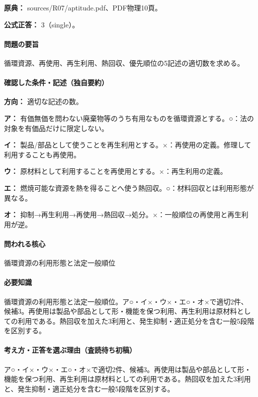 \noindent\textbf{原典：} sources/R07/aptitude.pdf、PDF物理10頁。

\textbf{公式正答：} 3（single）。

\paragraph{問題の要旨} 循環資源、再使用、再生利用、熱回収、優先順位の5記述の適切数を求める。

\paragraph{確認した条件・記述（独自要約）}\mbox{}\par

\noindent\textbf{方向：} 適切な記述の数。\par

\noindent\textbf{ア：} 有価無価を問わない廃棄物等のうち有用なものを循環資源とする。○：法の対象を有価品だけに限定しない。\par

\noindent\textbf{イ：} 製品/部品として使うことを再生利用とする。×：再使用の定義。修理して利用することも再使用。\par

\noindent\textbf{ウ：} 原材料として利用することを再使用とする。×：再生利用の定義。\par

\noindent\textbf{エ：} 燃焼可能な資源を熱を得ることへ使う熱回収。○：材料回収とは利用形態が異なる。\par

\noindent\textbf{オ：} 抑制→再生利用→再使用→熱回収→処分。×：一般順位の再使用と再生利用が逆。\par

\paragraph{問われる核心} 循環資源の利用形態と法定一般順位

\paragraph{必要知識} 循環資源の利用形態と法定一般順位。ア○・イ×・ウ×・エ○・オ×で適切2件、候補3。再使用は製品や部品として形・機能を保つ利用、再生利用は原材料としての利用である。熱回収を加えた3利用と、発生抑制・適正処分を含む一般5段階を区別する。

\paragraph{考え方・正答を選ぶ理由（査読待ち初稿）} ア○・イ×・ウ×・エ○・オ×で適切2件、候補3。再使用は製品や部品として形・機能を保つ利用、再生利用は原材料としての利用である。熱回収を加えた3利用と、発生抑制・適正処分を含む一般5段階を区別する。

